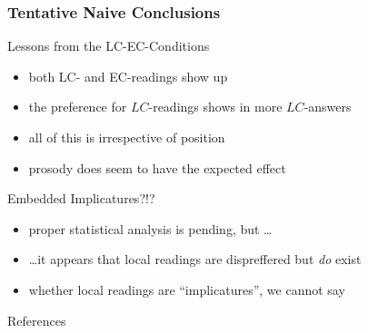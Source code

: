 \documentclass[fleqn,10pt,serif,xcolor=dvipsnames]{beamer}
\newcommand{\LC}{LC}
\newcommand{\EC}{EC}
\begin{document}
\begin{frame}
  \frametitle{Tentative Naive Conclusions}
  \begin{block}{Lessons from the \LC-\EC-Conditions}
    \begin{itemize}
    \item both \LC- and \EC-readings show up 
    \item the preference for $\LC$-readings shows in more $\LC$-answers
    \item all of this is irrespective of position
    \item prosody does seem to have the expected effect
    \end{itemize}
  \end{block}

  \begin{block}{Embedded Implicatures?!?}
    \begin{itemize}
    \item proper statistical analysis is pending, but \dots
    \item \dots it appears that local readings are dispreffered but
      \emph{do} exist
    \item whether local readings are ``implicatures'', we cannot say
    \end{itemize}
  \end{block}
  
\end{frame}



\begin{frame}
  \begin{block}{References}
    \printbibliography[heading=subbibliography]
  \end{block}
\end{frame}
\end{document}
